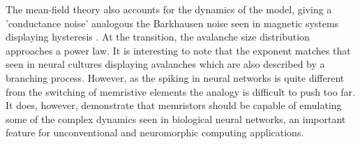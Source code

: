 \documentclass[aps,prl,reprint,groupedaddress]{revtex4-1}
\begin{document}
The mean-field theory also accounts for the dynamics of the model, giving
a 'conductance noise' analogous the Barkhausen noise seen in magnetic systems
displaying hysteresis \cite{Sethna1993}.  At the transition, the avalanche
size distribution approaches a power law.  It is interesting to note that
the exponent matches that seen in neural cultures \cite{Beggs2003} displaying avalanches which
are also described by a branching process. However, as the spiking in neural
networks is quite different from the switching of memristive elements the
analogy is difficult to push too far.  It does, however, demonstrate that
memristors should be capable of emulating some of the complex dynamics seen in biological
neural networks, an important feature for unconventional and neuromorphic computing applications. 


%


\end{document}
